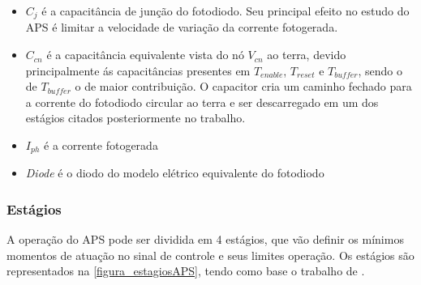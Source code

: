 \clearpage

\begin{itemize}
    \item $C_j$ \'e a capacit\^ancia de jun{\c c}\~ao do fotodiodo. Seu principal efeito no estudo do APS \'e limitar a velocidade de varia{\c c}\~ao da corrente fotogerada.
    \item $C_{cn}$ \'e a capacit\^ancia equivalente vista do n\'o \emph{$V_{cn}$} ao terra, devido principalmente \'as capacit\^ancias presentes em \emph{$T_{enable}$},  \emph{$T_{reset}$} e \emph{$T_{buffer}$}, sendo o de \emph{$T_{buffer}$} o de maior contribui{\c c}\~ao. O capacitor cria um caminho fechado para a corrente do fotodiodo circular ao terra e ser descarregado em um dos est\'agios citados posteriormente no trabalho.
    \item \emph{$I_{ph}$} \'e a corrente fotogerada
    \item \emph{Diode} \'e o diodo do modelo el\'etrico equivalente do fotodiodo
    \emph{}
\end{itemize}

\subsubsection{Est\'agios}
\label{estagiosAPS}

A operação do APS pode ser dividida em 4 est\'agios, que vão definir os m\'inimos momentos de  atua{\c c}\~ao no sinal de controle e seus limites opera{\c c}\~ao. Os est\'agios s\~ao representados na \autoref{figura_estagiosAPS}, tendo como base o trabalho de \cite{LidianeCampos}.

